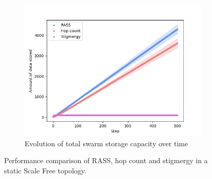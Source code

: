 \documentclass[sigconf]{aamas}
\begin{document}
\begin{figure}
\begin{subfigure}{0.30\textwidth}
        \includegraphics[width=\textwidth]{figures/scale_storage.png}
        \caption{Evolution of total swarm storage capacity over time}
        \label{results:scale_100_storage}
    \end{subfigure}
    \caption{Performance comparison of RASS, hop count and stigmergy in a static Scale Free topology.}
    \label{results:staticTopologyScale}
    \vspace{-2mm}
\end{figure}
\end{document}
